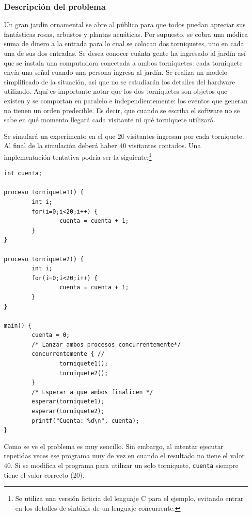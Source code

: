 \documentclass[11pt,fleqn]{book} %
\begin{document}
\subsubsection{Descripción del problema}
\label{sec-3-3-2-1}


Un gran jardín ornamental se abre al público para que todos puedan
apreciar sus fantásticas rosas, arbustos y plantas acuáticas. Por
supuesto, se cobra una módica suma de dinero a la entrada para lo cual
se colocan dos torniquetes, uno en cada una de sus dos entradas. Se desea
conocer cuánta gente ha ingresado al jardín así que se instala una
computadora conectada a ambos torniquetes: cada torniquete envía una
señal cuando una persona ingresa al jardín. Se realiza un modelo
simplificado de la situación, así que no se estudiarán los
detalles del hardware utilizado. Aquí es importante notar que los dos
torniquetes son objetos que existen y se comportan en paralelo e independientemente: los
eventos que generan no tienen un orden predecible. Es decir, que
cuando se escriba el software no se sabe en qué momento llegará cada
visitante ni qué torniquete utilizará.

Se simulará un experimento en el que 20 visitantes ingresan por cada
torniquete. Al final de la simulación deberá haber 40 visitantes
contados. Una implementación tentativa podría ser la
siguiente:\footnote{Se utiliza una versión
ficticia del lenguaje C para el ejemplo, evitando entrar en los
detalles de sintáxis de un lenguaje concurrente. }


\begin{verbatim}
int cuenta; 

proceso torniquete1() {
        int i;
        for(i=0;i<20;i++) {
                cuenta = cuenta + 1;
        }
}

proceso torniquete2() {
        int i;
        for(i=0;i<20;i++) {
                cuenta = cuenta + 1;
        }
}

main() {
        cuenta = 0;
        /* Lanzar ambos procesos concurrentemente*/
        concurrentemente { //
                torniquete1();
                torniquete2();
        }
        /* Esperar a que ambos finalicen */
        esperar(torniquete1);
        esperar(torniquete2);
        printf("Cuenta: %d\n", cuenta);
}
\end{verbatim}

Como se ve el problema es muy sencillo. Sin embargo, al
intentar ejecutar repetidas veces ese programa muy de vez en cuando el
resultado no tiene el valor 40. Si se modifica el programa para
utilizar un solo torniquete, \texttt{cuenta} siempre tiene el valor correcto
(20).
\end{document}
